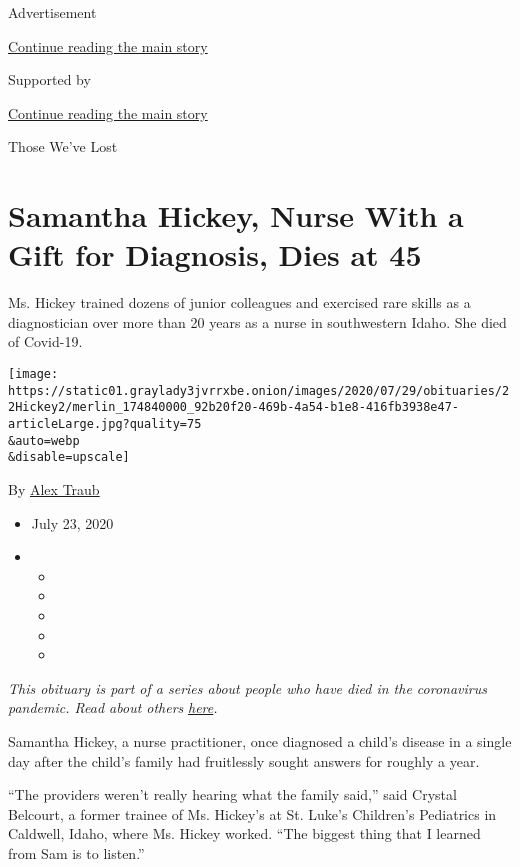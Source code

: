 Advertisement

\protect\hyperlink{after-top}{Continue reading the main story}

Supported by

\protect\hyperlink{after-sponsor}{Continue reading the main story}

Those We've Lost

\hypertarget{samantha-hickey-nurse-with-a-gift-for-diagnosis-dies-at-45}{%
\section{Samantha Hickey, Nurse With a Gift for Diagnosis, Dies at
45}\label{samantha-hickey-nurse-with-a-gift-for-diagnosis-dies-at-45}}

Ms. Hickey trained dozens of junior colleagues and exercised rare skills
as a diagnostician over more than 20 years as a nurse in southwestern
Idaho. She died of Covid-19.

\texttt{[image: https://static01.graylady3jvrrxbe.onion/images/2020/07/29/obituaries/22Hickey2/merlin\_174840000\_92b20f20-469b-4a54-b1e8-416fb3938e47-articleLarge.jpg?quality=75\\\&auto=webp\\\&disable=upscale]}

By \href{https://www.nytimes3xbfgragh.onion/by/alex-traub}{Alex Traub}

\begin{itemize}
\item
  July 23, 2020
\item
  \begin{itemize}
  \item
  \item
  \item
  \item
  \item
  \end{itemize}
\end{itemize}

\emph{This obituary is part of a series about people who have died in
the coronavirus pandemic. Read about others}
\href{https://www.nytimes3xbfgragh.onion/interactive/2020/obituaries/people-died-coronavirus-obituaries.html}{\emph{here}}\emph{.}

Samantha Hickey, a nurse practitioner, once diagnosed a child's disease
in a single day after the child's family had fruitlessly sought answers
for roughly a year.

``The providers weren't really hearing what the family said,'' said
Crystal Belcourt, a former trainee of Ms. Hickey's at St. Luke's
Children's Pediatrics in Caldwell, Idaho, where Ms. Hickey worked. ``The
biggest thing that I learned from Sam is to listen.''

